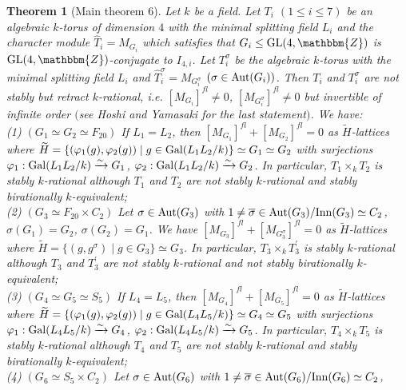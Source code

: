 \documentclass{amsart}
\theoremstyle{plain}
\newtheorem{theorem}{Theorem}[section]
\theoremstyle{definition}
\theoremstyle{remark}
\newcommand{\bZ}{\mathbbm{Z}}\newcommand{\bQ}{\mathbbm{Q}}
\newcommand{\GL}{{\rm GL}}\newcommand{\SL}{{\rm SL}}
\begin{document}
\begin{theorem}[Main theorem 6]\label{thmain6}
Let $k$ be a field. 
Let $T_i$ $(1\leq i\leq 7)$ be an algebraic $k$-torus of dimension $4$ 
with the minimal splitting field $L_i$ and 
the character module $\widehat{T}_i=M_{G_i}$ which satisfies that 
$G_i\leq \GL(4,\bZ)$ is $\GL(4,\bZ)$-conjugate to $I_{4,i}$. 
Let $T_i^\sigma$ be the algebraic $k$-torus 
with the minimal splitting field $L_i$ and 
$\widehat{T}_i^\sigma=M_{G_i^\sigma}$ $(\sigma\in {\rm Aut}(G_i))$. 
Then $T_i$ and $T_i^\sigma$ are not stably but retract $k$-rational, 
i.e. $[M_{G_i}]^{fl}\neq 0$, $[M_{G_i^{\sigma}}]^{fl}\neq 0$ but invertible of infinite order $($see Hoshi and Yamasaki \cite[Theorem 1.27]{HY17} for the last statement$)$. 
We have:\\
{\rm (1)} $(G_1\simeq G_2\simeq F_{20})$ If $L_1=L_2$, then
$[M_{G_1}]^{fl}+[M_{G_2}]^{fl}=0$ as $\widetilde{H}$-lattices 
where $\widetilde{H}=\{(\varphi_1(g),\varphi_2(g))\mid g\in {\rm Gal}(L_1L_2/k)\}\simeq G_1\simeq G_2$ with surjections $\varphi_1: {\rm Gal}(L_1L_2/k)\xrightarrow{\sim} G_1$, $\varphi_2: {\rm Gal}(L_1L_2/k)\xrightarrow{\sim} G_2$. 
In particular, $T_1\times_k T_2$ is stably $k$-rational 
although $T_1$ and $T_2$ are not stably $k$-rational and stably birationally $k$-equivalent;\\
{\rm (2)} $(G_3\simeq F_{20}\times C_2)$ Let $\sigma\in {\rm Aut}(G_3)$ with 
$1\neq \overline{\sigma}\in {\rm Aut}(G_3)/{\rm Inn}(G_3)\simeq C_2$, 
$\sigma(G_1)=G_2$, $\sigma(G_2)=G_1$. 
We have
$[M_{G_3}]^{fl}+[M_{G_3^\sigma}]^{fl}=0$ as $\widetilde{H}$-lattices 
where $\widetilde{H}=\{(g,g^\sigma)\mid g\in G_3\}\simeq G_3$. 
In particular, $T_3\times_k T_3^\prime$ is stably $k$-rational 
although $T_3$ and $T_3^\prime$ are not stably $k$-rational and not stably birationally $k$-equivalent;\\
{\rm (3)} $(G_4\simeq G_5\simeq S_5)$ If $L_4=L_5$, then
$[M_{G_4}]^{fl}+[M_{G_5}]^{fl}=0$ as $\widetilde{H}$-lattices 
where $\widetilde{H}=\{(\varphi_1(g),\varphi_2(g))\mid g\in {\rm Gal}(L_4L_5/k)\}\simeq G_4\simeq G_5$ with surjections $\varphi_1: {\rm Gal}(L_4L_5/k)\xrightarrow{\sim} G_4$, $\varphi_2: {\rm Gal}(L_4L_5/k)\xrightarrow{\sim} G_5$. 
In particular, $T_4\times_k T_5$ is stably $k$-rational 
although $T_4$ and $T_5$ are not stably $k$-rational and stably birationally $k$-equivalent;\\
{\rm (4)} $(G_6\simeq S_5\times C_2)$ Let $\sigma\in {\rm Aut}(G_6)$ with 
$1\neq \overline{\sigma}\in {\rm Aut}(G_6)/{\rm Inn}(G_6)\simeq C_2$, 

\end{theorem}
\end{document}
